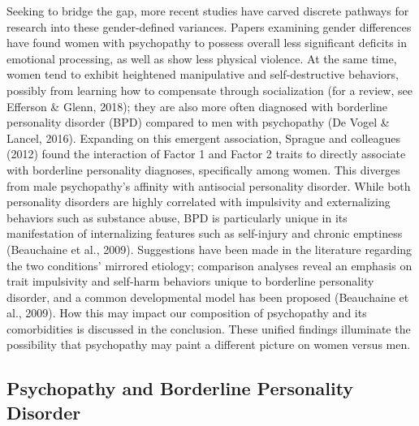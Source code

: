 \documentclass[
  man,floatsintext]{apa7}
\begin{document}
Seeking to bridge the gap, more recent studies have carved discrete pathways for research into these gender-defined variances. Papers examining gender differences have found women with psychopathy to possess overall less significant deficits in emotional processing, as well as show less physical violence. At the same time, women tend to exhibit heightened manipulative and self-destructive behaviors, possibly from learning how to compensate through socialization (for a review, see Efferson \& Glenn, 2018); they are also more often diagnosed with borderline personality disorder (BPD) compared to men with psychopathy (De Vogel \& Lancel, 2016). Expanding on this emergent association, Sprague and colleagues (2012) found the interaction of Factor 1 and Factor 2 traits to directly associate with borderline personality diagnoses, specifically among women. This diverges from male psychopathy's affinity with antisocial personality disorder. While both personality disorders are highly correlated with impulsivity and externalizing behaviors such as substance abuse, BPD is particularly unique in its manifestation of internalizing features such as self-injury and chronic emptiness (Beauchaine et al., 2009). Suggestions have been made in the literature regarding the two conditions' mirrored etiology; comparison analyses reveal an emphasis on trait impulsivity and self-harm behaviors unique to borderline personality disorder, and a common developmental model has been proposed (Beauchaine et al., 2009). How this may impact our composition of psychopathy and its comorbidities is discussed in the conclusion. These unified findings illuminate the possibility that psychopathy may paint a different picture on women versus men.

\hypertarget{psychopathy-and-borderline-personality-disorder}{%
\subsection{Psychopathy and Borderline Personality Disorder}\label{psychopathy-and-borderline-personality-disorder}}
\end{document}
